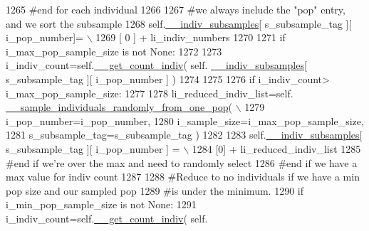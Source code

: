 \begin{DoxyCode}
1265             \textcolor{comment}{#end for each individual}
1266 
1267             \textcolor{comment}{#we always include the "pop" entry, and we sort the subsample}
1268             self.\hyperlink{classnegui_1_1genepopfilemanager_1_1GenepopFileManager_a1e8379bcee4902ca9314ff53fcb71644}{\_\_indiv\_subsamples}[ s\_subsample\_tag ][ i\_pop\_number]= \(\backslash\)
1269                                                  [ 0 ] +  li\_indiv\_numbers
1270 
1271             \textcolor{keywordflow}{if} i\_max\_pop\_sample\_size \textcolor{keywordflow}{is} \textcolor{keywordflow}{not} \textcolor{keywordtype}{None}:
1272 
1273                 i\_indiv\_count=self.\hyperlink{classnegui_1_1genepopfilemanager_1_1GenepopFileManager_ac7cc98fe56efee82b4ffd4dc816a4704}{\_\_get\_count\_indiv}( self.
      \hyperlink{classnegui_1_1genepopfilemanager_1_1GenepopFileManager_a1e8379bcee4902ca9314ff53fcb71644}{\_\_indiv\_subsamples}[ s\_subsample\_tag ][ i\_pop\_number ] )
1274 
1275                 
1276                 \textcolor{keywordflow}{if} i\_indiv\_count> i\_max\_pop\_sample\_size:
1277 
1278                     li\_reduced\_indiv\_list=self.
      \hyperlink{classnegui_1_1genepopfilemanager_1_1GenepopFileManager_a9818467c9cb40f8e1de0c6cc7f52e263}{\_\_sample\_individuals\_randomly\_from\_one\_pop}( \(\backslash\)
1279                                                             i\_pop\_number=i\_pop\_number,
1280                                                             i\_sample\_size=i\_max\_pop\_sample\_size,
1281                                                             s\_subsample\_tag=s\_subsample\_tag )
1282 
1283                     self.\hyperlink{classnegui_1_1genepopfilemanager_1_1GenepopFileManager_a1e8379bcee4902ca9314ff53fcb71644}{\_\_indiv\_subsamples}[ s\_subsample\_tag ][ i\_pop\_number ] = \(\backslash\)
1284                                                         [0] + li\_reduced\_indiv\_list
1285                 \textcolor{comment}{#end if we're over the max and need to randomly select}
1286             \textcolor{comment}{#end if we have a max value for indiv count}
1287 
1288             \textcolor{comment}{#Reduce to no individuals if we have a min pop size and our sampled pop}
1289             \textcolor{comment}{#is under the minimum.}
1290             \textcolor{keywordflow}{if} i\_min\_pop\_sample\_size \textcolor{keywordflow}{is} \textcolor{keywordflow}{not} \textcolor{keywordtype}{None}:
1291                 i\_indiv\_count=self.\hyperlink{classnegui_1_1genepopfilemanager_1_1GenepopFileManager_ac7cc98fe56efee82b4ffd4dc816a4704}{\_\_get\_count\_indiv}( self.

\end{DoxyCode}
